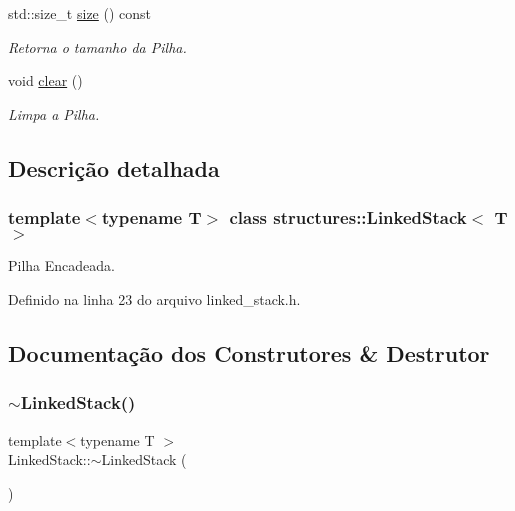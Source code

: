 \begin{DoxyCompactItemize}
std\+::size\+\_\+t \mbox{\hyperlink{classstructures_1_1_linked_stack_a0c7926b74ce17436c28fa18efd3f15a2}{size}} () const
\begin{DoxyCompactList}\small\item\em Retorna o tamanho da Pilha. \end{DoxyCompactList}\item 
void \mbox{\hyperlink{classstructures_1_1_linked_stack_ac0491cef165f5beb3a00a4979aa8c349}{clear}} ()
\begin{DoxyCompactList}\small\item\em Limpa a Pilha. \end{DoxyCompactList}\end{DoxyCompactItemize}


\subsection{Descrição detalhada}
\subsubsection*{template$<$typename T$>$\newline
class structures\+::\+Linked\+Stack$<$ T $>$}

Pilha Encadeada. 

Definido na linha 23 do arquivo linked\+\_\+stack.\+h.



\subsection{Documentação dos Construtores \& Destrutor}
\mbox{\label{classstructures_1_1_linked_stack_ab2fdb20d8918bf824e50a9038acef636}} 
\subsubsection{\texorpdfstring{$\sim$LinkedStack()}{~LinkedStack()}}
{\footnotesize\ttfamily template$<$typename T $>$ \\
Linked\+Stack\+::$\sim$\+Linked\+Stack (\begin{DoxyParamCaption}{ }\end{DoxyParamCaption})}



